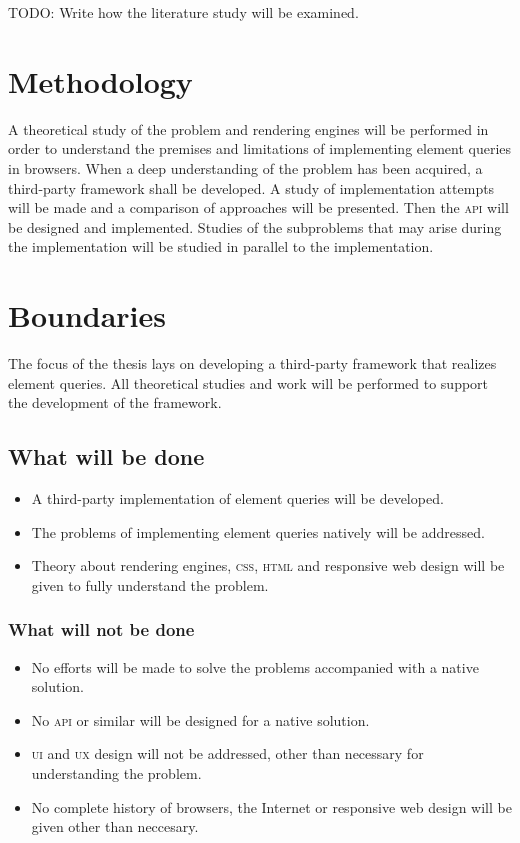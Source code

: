 \documentclass[oneside,a4paper,11pt]{kth-mag}
\begin{document}
TODO: Write how the literature study will be examined.

\section*{Methodology}
A theoretical study of the problem and rendering engines will be performed in order to understand the premises and limitations of implementing element queries in browsers. When a deep understanding of the problem has been acquired, a third-party framework shall be developed. A study of implementation attempts will be made and a comparison of approaches will be presented. Then the \textsc{api} will be designed and implemented. Studies of the subproblems that may arise during the implementation will be studied in parallel to the implementation.

\section*{Boundaries}
The focus of the thesis lays on developing a third-party framework that realizes element queries. All theoretical studies and work will be performed to support the development of the framework.

\subsection*{What will be done}
\begin{itemize}
\item A third-party implementation of element queries will be developed.
\item The problems of implementing element queries natively will be addressed.
\item Theory about rendering engines, \textsc{css}, \textsc{html} and responsive web design will be given to fully understand the problem.
\end{itemize}

\subsubsection*{What will not be done}
\begin{itemize}
\item No efforts will be made to solve the problems accompanied with a native solution.
\item No \textsc{api} or similar will be designed for a native solution.
\item \textsc{ui} and \textsc{ux} design will not be addressed, other than necessary for understanding the problem.
\item No complete history of browsers, the Internet or responsive web design will be given other than neccesary.
\end{itemize}
\end{document}
